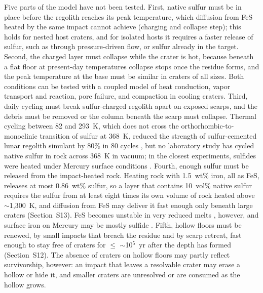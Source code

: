 \documentclass[article,review]{planetary}
\begin{document}
Five parts of the model have not been tested. First, native sulfur must be in place before the regolith reaches its peak temperature, which diffusion from FeS heated by the same impact cannot achieve (charging and collapse step); this holds for nested host craters, and for isolated hosts it requires a faster release of sulfur, such as through pressure-driven flow, or sulfur already in the target. Second, the charged layer must collapse while the crater is hot, because beneath a flat floor at present-day temperatures collapse stops once the residue forms, and the peak temperature at the base must be similar in craters of all sizes. Both conditions can be tested with a coupled model of heat conduction, vapor transport and reaction, pore failure, and compaction in cooling craters. Third, daily cycling must break sulfur-charged regolith apart on exposed scarps, and the debris must be removed or the column beneath the scarp must collapse. Thermal cycling between 82 and 293~K, which does not cross the orthorhombic-to-monoclinic transition of sulfur at 368~K, reduced the strength of sulfur-cemented lunar regolith simulant by 80\% in 80 cycles \parencite{grugel2008}, but no laboratory study has cycled native sulfur in rock across 368~K in vacuum; in the closest experiments, sulfides were heated under Mercury surface conditions \parencite{helbert2013,varatharajan2019,barbaro2023}. Fourth, enough sulfur must be released from the impact-heated rock. Heating rock with 1.5~wt\% iron, all as FeS, releases at most 0.86~wt\% sulfur, so a layer that contains 10~vol\% native sulfur requires the sulfur from at least eight times its own volume of rock heated above $\sim$1,300~K, and diffusion from FeS may deliver it fast enough only beneath large craters (Section~S13). FeS becomes unstable in very reduced melts \parencite{anzures2020}, however, and surface iron on Mercury may be mostly sulfide \parencite{weider2014,renggli2026}. Fifth, hollow floors must be renewed, by small impacts that breach the residue and by scarp retreat, fast enough to stay free of craters for $\leq$ $\sim$10$^5$~yr after the depth has formed (Section~S12). The absence of craters on hollow floors may partly reflect survivorship, however: an impact that leaves a resolvable crater may erase a hollow or hide it, and smaller craters are unresolved or are consumed as the hollow grows.
\end{document}
